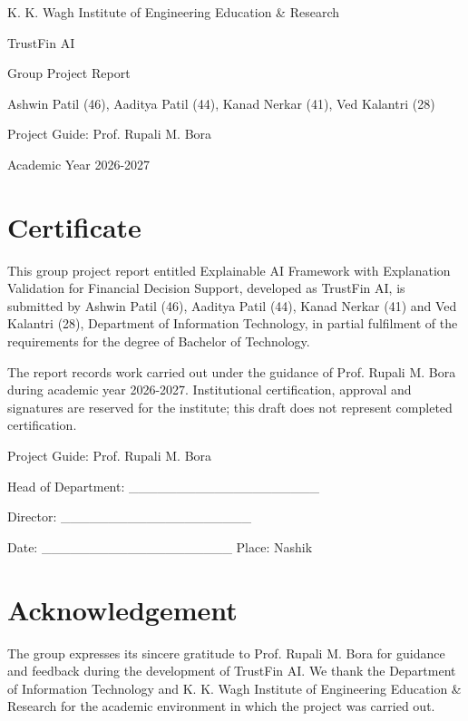 \documentclass[12pt,a4paper]{report}
\begin{document}
\begin{titlepage}\centering K. K. Wagh Institute of Engineering Education \& Research\par\vspace{2cm}{\Large Explainable AI Framework with Explanation Validation for Financial Decision Support}\par\vspace{1cm}TrustFin AI\par Group Project Report\par\vspace{1cm}Ashwin Patil (46), Aaditya Patil (44), Kanad Nerkar (41), Ved Kalantri (28)\par Project Guide: Prof. Rupali M. Bora\par Academic Year 2026-2027\end{titlepage}
\chapter*{Certificate}
This group project report entitled Explainable AI Framework with Explanation Validation for Financial Decision Support, developed as TrustFin AI, is submitted by Ashwin Patil (46), Aaditya Patil (44), Kanad Nerkar (41) and Ved Kalantri (28), Department of Information Technology, in partial fulfilment of the requirements for the degree of Bachelor of Technology.

The report records work carried out under the guidance of Prof. Rupali M. Bora during academic year 2026-2027. Institutional certification, approval and signatures are reserved for the institute; this draft does not represent completed certification.

Project Guide: Prof. Rupali M. Bora

Head of Department: \_\_\_\_\_\_\_\_\_\_\_\_\_\_\_\_\_\_\_\_

Director: \_\_\_\_\_\_\_\_\_\_\_\_\_\_\_\_\_\_\_\_

Date: \_\_\_\_\_\_\_\_\_\_\_\_\_\_\_\_\_\_\_\_    Place: Nashik

\chapter*{Acknowledgement}
The group expresses its sincere gratitude to Prof. Rupali M. Bora for guidance and feedback during the development of TrustFin AI. We thank the Department of Information Technology and K. K. Wagh Institute of Engineering Education \& Research for the academic environment in which the project was carried out.
\end{document}
